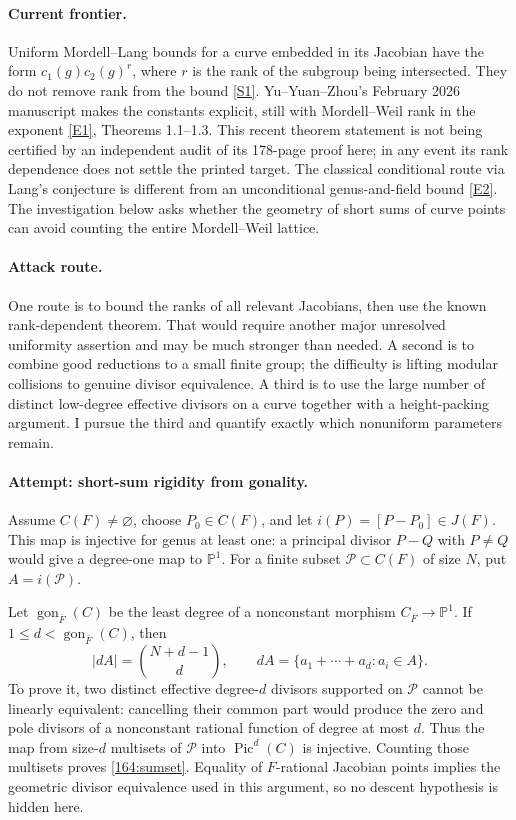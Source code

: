 \documentclass[11pt,a4paper]{article}
\newcommand{\PP}{\mathbb P}
\newcommand{\sref}[2]{\hyperlink{source:#1:#2}{[S#2]}}
\newcommand{\eref}[2]{\hyperlink{extra:#1:#2}{[E#2]}}
\numberwithin{equation}{section}
\begin{document}
\paragraph{Current frontier.}
Uniform Mordell--Lang bounds for a curve embedded in its Jacobian have
the form $c_1(g)c_2(g)^r$, where $r$ is the rank of the subgroup being
intersected. They do not remove rank from the bound
\sref{164}{1}. Yu--Yuan--Zhou's February 2026 manuscript makes the
constants explicit, still with Mordell--Weil rank in the exponent
\eref{164}{1}, Theorems 1.1--1.3. This recent theorem statement is not
being certified by an independent audit of its 178-page proof here; in
any event its rank dependence does not settle the printed target.
The classical conditional route via Lang's conjecture is different from
an unconditional genus-and-field bound \eref{164}{2}. The investigation
below asks whether the geometry of short sums of curve points can avoid
counting the entire Mordell--Weil lattice.

\paragraph{Attack route.}
One route is to bound the ranks of all relevant Jacobians, then use the
known rank-dependent theorem. That would require another major unresolved
uniformity assertion and may be much stronger than needed. A second is
to combine good reductions to a small finite group; the difficulty is
lifting modular collisions to genuine divisor equivalence. A third is
to use the large number of distinct low-degree effective divisors on a
curve together with a height-packing argument. I pursue the third and
quantify exactly which nonuniform parameters remain.

\paragraph{Attempt: short-sum rigidity from gonality.}
Assume $C(F)\ne\varnothing$, choose $P_0\in C(F)$, and let
$i(P)=[P-P_0]\in J(F)$. This map is injective for genus at least one:
a principal divisor $P-Q$ with $P\ne Q$ would give a degree-one map to
$\PP^1$. For a finite subset $\mathcal P\subset C(F)$ of size $N$, put
$A=i(\mathcal P)$.

Let $\operatorname{gon}_{\overline F}(C)$ be the least degree of a
nonconstant morphism $C_{\overline F}\to\PP^1$. If
$1\le d<\operatorname{gon}_{\overline F}(C)$, then
\begin{equation}\label{164:sumset}
 |dA|=\binom{N+d-1}{d},
 \qquad dA=\{a_1+\cdots+a_d:a_i\in A\}.
\end{equation}
To prove it, two distinct effective degree-$d$ divisors supported on
$\mathcal P$ cannot be linearly equivalent: cancelling their common
part would produce the zero and pole divisors of a nonconstant rational
function of degree at most $d$. Thus the map from size-$d$ multisets of
$\mathcal P$ into $\operatorname{Pic}^d(C)$ is injective. Counting those
multisets proves \eqref{164:sumset}. Equality of $F$-rational Jacobian
points implies the geometric divisor equivalence used in this argument,
so no descent hypothesis is hidden here.
\end{document}
